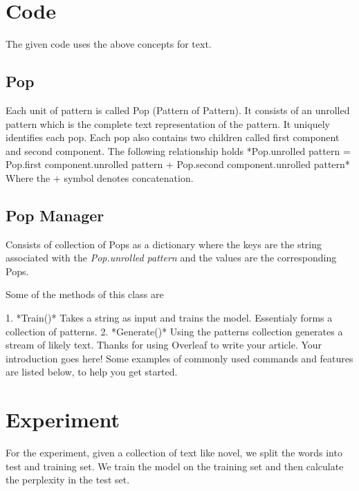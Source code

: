 \documentclass[fleqn,10pt]{olplainarticle}
\begin{document}
\section*{Code}
The given code uses the above concepts for text. 

\subsection{Pop}
Each unit of pattern is called Pop (Pattern of Pattern). It consists of an unrolled pattern which is the complete text representation of the pattern. It uniquely identifies each pop. Each pop also contains two children called first component and second component. 
The following relationship holds 
*Pop.unrolled pattern = Pop.first component.unrolled pattern + Pop.second component.unrolled pattern*
Where the + symbol denotes concatenation. 

\subsection{Pop Manager}
Consists of collection of Pops as a dictionary where the keys are the string associated with the \textit{Pop.unrolled pattern} and the values are the corresponding Pops.

Some of the methods of this class are 

1. *Train()* Takes a string as input and trains the model. Essentialy forms a collection of patterns.
2. *Generate()* Using the patterns collection generates a stream of likely text. 
Thanks for using Overleaf to write your article. Your introduction goes here! Some examples of commonly used commands and features are listed below, to help you get started.

\section*{Experiment}
For the experiment, given a collection of text like novel, we split the words into test and training set. We train the model on the training set and then calculate the perplexity in the test set.














\end{document}
